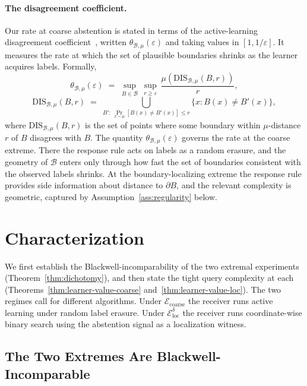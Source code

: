 \documentclass[runningheads,envcountsame]{llncs}
\newcommand{\cB}{\mathcal{B}}
\newcommand{\cE}{\mathcal{E}}
\newcommand{\eps}{\varepsilon}
\newcommand{\dis}{\theta}
\begin{document}
\paragraph{The disagreement coefficient.}
Our rate at coarse abstention is stated in terms of the active-learning disagreement coefficient~\cite{hanneke2014theory}, written $\dis_{\cB, \mu}(\eps)$ and taking values in $[1, 1/\eps]$. It measures the rate at which the set of plausible boundaries shrinks as the learner acquires labels. Formally,
\[
\dis_{\cB, \mu}(\eps) \;=\; \sup_{B \in \cB} \,\sup_{r \geq \eps}\, \frac{\mu(\mathrm{DIS}_{\cB, \mu}(B, r))}{r},
\]
\[
\mathrm{DIS}_{\cB, \mu}(B, r) \;=\; \bigcup_{B' :\, \Pr_{x \sim \mu}[B(x) \neq B'(x)] \leq r} \{x : B(x) \neq B'(x)\},
\]
where $\mathrm{DIS}_{\cB, \mu}(B, r)$ is the set of points where some boundary within $\mu$-distance $r$ of $B$ disagrees with $B$. The quantity $\dis_{\cB, \mu}(\eps)$ governs the rate at the coarse extreme. There the response rule acts on labels as a random erasure, and the geometry of $\cB$ enters only through how fast the set of boundaries consistent with the observed labels shrinks. At the boundary-localizing extreme the response rule provides side information about distance to $\partial B$, and the relevant complexity is geometric, captured by Assumption~\ref{ass:regularity} below.

\section{Characterization}
\label{sec:characterization}

We first establish the Blackwell-incomparability of the two extremal experiments (Theorem~\ref{thm:dichotomy}), and then state the tight query complexity at each (Theorems~\ref{thm:learner-value-coarse} and~\ref{thm:learner-value-loc}). The two regimes call for different algorithms. Under $\cE_{\mathrm{coarse}}$ the receiver runs active learning under random label erasure. Under $\cE_{\mathrm{loc}}^\delta$ the receiver runs coordinate-wise binary search using the abstention signal as a localization witness.

\subsection{The Two Extremes Are Blackwell-Incomparable}
\label{sec:dichotomy}
\end{document}
